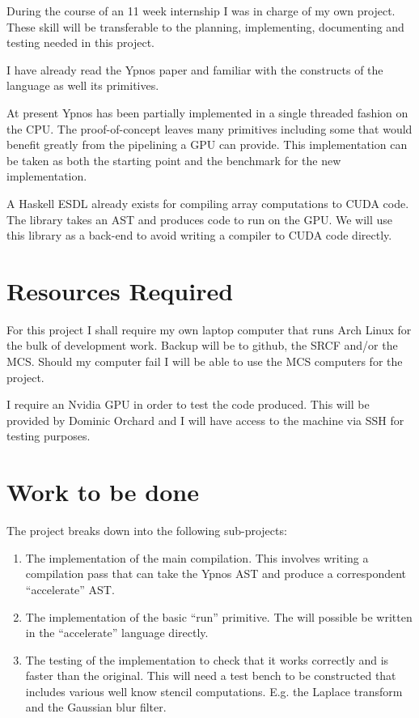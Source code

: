 During the course of an 11 week internship I was in charge of my own project.  
These skill will be transferable to the planning, implementing, documenting and 
testing needed in this project.

I have already read the Ypnos paper and familiar with the constructs of the 
language as well its primitives.

At present Ypnos has been partially implemented in a single threaded fashion on 
the CPU. The proof-of-concept leaves many primitives including some that would 
benefit greatly from the pipelining a GPU can provide. This implementation can 
be taken as both the starting point and the benchmark for the new 
implementation.

A Haskell ESDL already exists for compiling array computations to CUDA code.  
The library takes an AST and produces code to run on the GPU. We will use this 
library as a back-end to avoid writing a compiler to CUDA code directly.

\section*{Resources Required}

For this project I shall require my own laptop computer that runs Arch Linux 
for the bulk of development work. Backup will be to github, the SRCF and/or the 
MCS. Should my computer fail I will be able to use the MCS computers for the 
project.

I require an Nvidia GPU in order to test the code produced. This will be 
provided by Dominic Orchard and I will have access to the machine via SSH for 
testing purposes.

\section*{Work to be done}

The project breaks down into the following sub-projects:

\begin{enumerate}

\item The implementation of the main compilation. This involves writing a 
compilation pass that can take the Ypnos AST and produce a correspondent 
``accelerate'' AST.

\item The implementation of the basic ``run'' primitive. The will possible be 
written in the ``accelerate'' language directly.

\item The testing of the implementation to check that it works correctly and is 
faster than the original. This will need a test bench to be constructed that 
includes various well know stencil computations. E.g. the Laplace transform and 
the Gaussian blur filter.

\end{enumerate}

